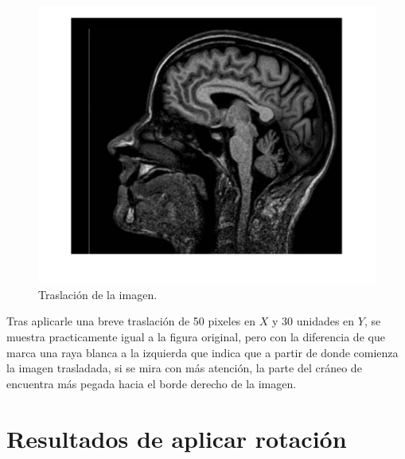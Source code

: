 \documentclass[11pt, letterpaper]{article}
\begin{document}
\begin{figure}[h!]
	\centering
	\begin{minipage}{0.8\textwidth}
		\centering
		\includegraphics[width=\textwidth]{IMG/R1.jpg}
		\caption{Traslación de la imagen.}
		\label{fig:f7}
	\end{minipage}\hfill
\end{figure}

Tras aplicarle una breve traslación de 50 pixeles en $X$ y $30$ unidades en $Y$, se muestra practicamente igual a la figura original, pero con la diferencia de que marca una raya blanca a la izquierda que indica que a partir de donde comienza la imagen trasladada, si se mira con más atención, la parte del cráneo de encuentra más pegada hacia el borde derecho de la imagen.

\newpage


\section{Resultados de aplicar rotación}
\end{document}
